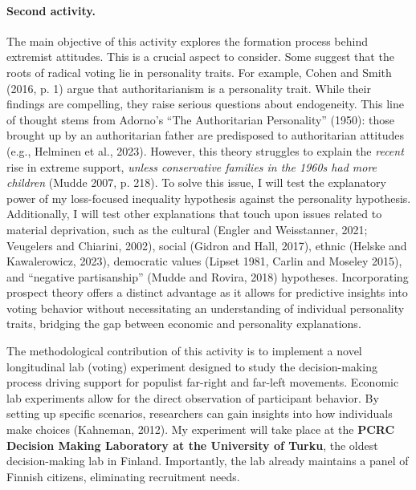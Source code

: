 \documentclass[letterpaper]{article}
\begin{document}
\paragraph{Second activity.} The main objective of this activity explores the formation process behind extremist attitudes. This is a crucial aspect to consider. Some suggest that the roots of radical voting lie in personality traits. For example, Cohen and Smith (2016, p. 1) argue that authoritarianism is a personality trait. While their findings are compelling, they raise serious questions about endogeneity. This line of thought stems from Adorno's ``The Authoritarian Personality'' (1950): those brought up by an authoritarian father are predisposed to authoritarian attitudes (e.g., Helminen et al., 2023). However, this theory struggles to explain the \emph{recent} rise in extreme support, \emph{unless conservative families in the 1960s had more children} (Mudde 2007, p. 218). To solve this issue, I will test the explanatory power of my loss-focused inequality hypothesis against the personality hypothesis. Additionally, I will test other explanations that touch upon issues related to material deprivation, such as the cultural (Engler and Weisstanner, 2021; Veugelers and Chiarini, 2002), social (Gidron and Hall, 2017), ethnic (Helske and Kawalerowicz, 2023), democratic values (Lipset 1981, Carlin and Moseley 2015), and ``negative partisanship'' (Mudde and Rovira, 2018) hypotheses. Incorporating prospect theory offers a distinct advantage as it allows for predictive insights into voting behavior without necessitating an understanding of individual personality traits, bridging the gap between economic and personality explanations.

\vspace{2mm}The methodological contribution of this activity is to implement a novel longitudinal lab (voting) experiment designed to study the decision-making process driving support for populist far-right and far-left movements. Economic lab experiments allow for the direct observation of participant behavior. By setting up specific scenarios, researchers can gain insights into how individuals make choices (Kahneman, 2012). My experiment will take place at the {\bf PCRC Decision Making Laboratory at the University of Turku}, the oldest decision-making lab in Finland.  Importantly, the lab already maintains a panel of Finnish citizens, eliminating recruitment needs. 
\end{document}
